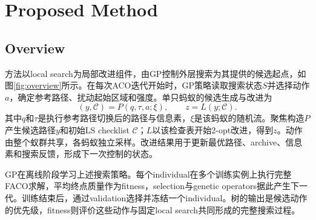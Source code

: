 \section{Proposed Method}
\subsection{Overview}
方法以local search为局部改进组件，由GP控制外层搜索为其提供的候选起点，如图\ref{fig:overview}所示。在每次ACO迭代开始时，GP策略读取搜索状态$S$并选择动作$a$，确定参考路径、扰动起始区域和强度。单只蚂蚁的候选生成与改进为
\begin{equation}
 (y,\mathcal C)=P(q,\tau,a;\xi),\qquad z=L(y;\mathcal C).
 \label{eq:search-cycle}
\end{equation}
其中$q$和$\tau$是执行参考路径切换后的路径与信息素，$\xi$是该蚂蚁的随机流。聚焦构造$P$产生候选路径$y$和初始LS checklist $\mathcal C$；$L$以该检查表开始2-opt改进，得到$z$。动作由整个蚁群共享，各蚂蚁独立采样。改进结果用于更新最优路径、archive、信息素和搜索反馈，形成下一次控制的状态。

GP在离线阶段学习上述搜索策略。每个individual在多个训练实例上执行完整FACO求解，平均终点质量作为fitness，selection与genetic operators据此产生下一代。训练结束后，通过validation选择并冻结一个individual。树的输出是候选动作的优先级，fitness则评价这些动作与固定local search共同形成的完整搜索过程。

